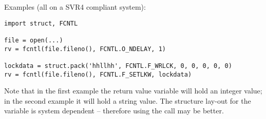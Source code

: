Examples (all on a SVR4 compliant system):

\bcode\begin{verbatim}
import struct, FCNTL

file = open(...)
rv = fcntl(file.fileno(), FCNTL.O_NDELAY, 1)

lockdata = struct.pack('hhllhh', FCNTL.F_WRLCK, 0, 0, 0, 0, 0)
rv = fcntl(file.fileno(), FCNTL.F_SETLKW, lockdata)
\end{verbatim}\ecode

Note that in the first example the return value variable  will
hold an integer value; in the second example it will hold a string
value.  The structure lay-out for the  variable is
system dependent -- therefore using the  call may be
better.

